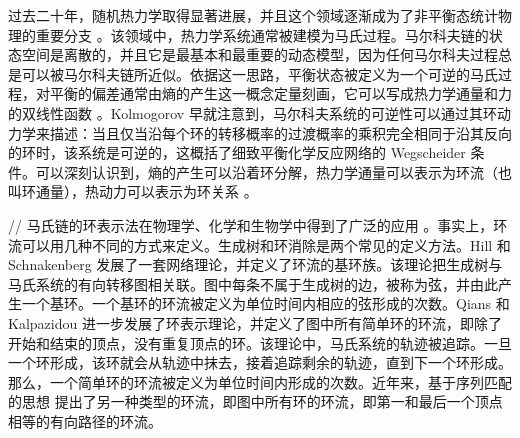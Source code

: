 

过去二十年，随机热力学取得显著进展，并且这个领域逐渐成为了非平衡态统计物理的重要分支 \cite{Fan2019Hmat,annurev-conmatphys,Seifert_2012} 。该领域中，热力学系统通常被建模为马氏过程。马尔科夫链的状态空间是离散的，并且它是最基本和最重要的动态模型，因为任何马尔科夫过程总是可以被马尔科夫链所近似。依据这一思路，平衡状态被定义为一个可逆的马氏过程，对平衡的偏差通常由熵的产生这一概念定量刻画，它可以写成热力学通量和力的双线性函数 \cite{VANDENBROECK20156}。Kolmogorov \cite{PhysRev.91.1505} 早就注意到，马尔科夫系统的可逆性可以通过其环动力学来描述：当且仅当沿每个环的转移概率的过渡概率的乘积完全相同于沿其反向的环时，该系统是可逆的，这概括了细致平衡化学反应网络的 Wegscheider 条件。可以深刻认识到，熵的产生可以沿着环分解，热力学通量可以表示为环流（也叫环通量），热动力可以表示为环关系 \cite{Math.Ann.112}。

//
马氏链的环表示法在物理学、化学和生物学中得到了广泛的应用 \cite{Schnakenberg1976NetworkTO,ZHANG20121}。事实上，环流可以用几种不同的方式来定义。生成树和环消除是两个常见的定义方法。Hill \cite{GE201287,Hill1966StudiesIIa,Hill1966StudiesIIb} 和 Schnakenberg \cite{Math.Ann.112} 发展了一套网络理论，并定义了环流的基环族。该理论把生成树与马氏系统的有向转移图相关联。图中每条不属于生成树的边，被称为弦，并由此产生一个基环。一个基环的环流被定义为单位时间内相应的弦形成的次数。Qians \cite{minping1982circulation,jian1984circulations,jiang2004mathematical}和 Kalpazidou \cite{kalpazidou2007cycle} 进一步发展了环表示理论，并定义了图中所有简单环的环流，即除了开始和结束的顶点，没有重复顶点的环。该理论中，马氏系统的轨迹被追踪。一旦一个环形成，该环就会从轨迹中抹去，接着追踪剩余的轨迹，直到下一个环形成。那么，一个简单环的环流被定义为单位时间内形成的次数。近年来，基于序列匹配的思想 \cite{roldan2019exact,biddle2020reversal,pietzonka2021cycle} 提出了另一种类型的环流，即图中所有环的环流，即第一和最后一个顶点相等的有向路径的环流。

